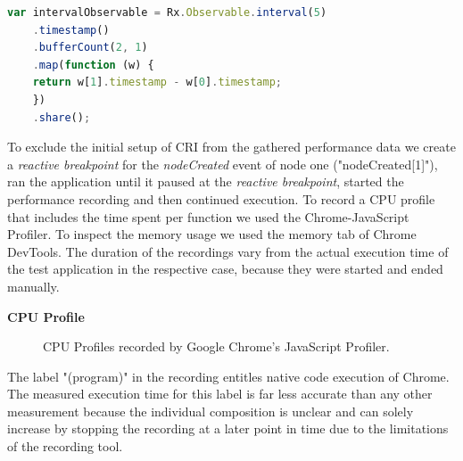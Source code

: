 	\begin{lstlisting}[language=JavaScript, caption={Example of RxJS code.},label={lst:performanceTestExtract}]
	var intervalObservable = Rx.Observable.interval(5)
	.timestamp()
	.bufferCount(2, 1)
	.map(function (w) {
	return w[1].timestamp - w[0].timestamp;
	})
	.share();	
	\end{lstlisting}

	To exclude the initial setup of CRI from the gathered performance data we create a \emph{reactive breakpoint} for the \emph{nodeCreated} event of node one ("nodeCreated[1]"), ran the application until it paused at the \emph{reactive breakpoint}, started the performance recording and then continued execution. To record a CPU profile that includes the time spent per function we used the Chrome-JavaScript Profiler. To inspect the memory usage we used the memory tab of Chrome DevTools. The duration of the recordings vary from the actual execution time of the test application in the respective case, because they were started and ended manually. 
	
	\textbf{CPU Profile}
	\begin{figure}[!h]
	\centering
	\hfill
	\caption{CPU Profiles recorded by Google Chrome's JavaScript Profiler.}
	\end{figure}
	
	The label "(program)" in the recording entitles native code execution of Chrome. The measured execution time for this label is far less accurate than any other measurement because the individual composition is unclear and can solely increase by stopping the recording at a later point in time due to the limitations of the recording tool.
	
